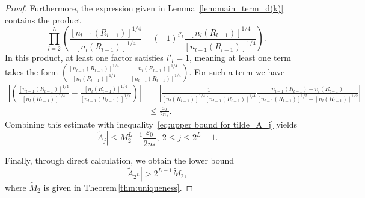 \documentclass[11pt,reqno]{amsart}
\theoremstyle{definition}
\theoremstyle{remark}
\numberwithin{equation}{section}
\begin{document}
\begin{proof}
Furthermore, the expression given in Lemma~\ref{lem:main_term_d(k)} contains the product  
\begin{equation*}
  \prod_{l=2}^{L} \left( \frac{\left[n_{l-1}(R_{l-1})\right]^{1/4}}{\left[n_l(R_{l-1})\right]^{1/4}}
	+ (-1)^{i'_l} \frac{\left[n_l(R_{l-1})\right]^{1/4}}{\left[n_{l-1}(R_{l-1})\right]^{1/4}} \right).
\end{equation*}
In this product, at least one factor satisfies $i'_l = 1$, meaning at least one term takes the form 
$\left(\frac{\left[n_{l-1}(R_{l-1})\right]^{1/4}}{\left[n_l(R_{l-1})\right]^{1/4}}-\frac{\left[n_l(R_{l-1})\right]^{1/4}}{\left[n_{l-1}(R_{l-1})\right]^{1/4}} \right)$. For such a term we have  
\begin{equation*}
  \begin{aligned}
     \left|\left( \frac{\left[n_{l-1}(R_{l-1})\right]^{1/4}}{\left[n_l(R_{l-1})\right]^{1/4}}-\frac{\left[n_l(R_{l-1})\right]^{1/4}}{\left[n_{l-1}(R_{l-1})\right]^{1/4}} \right)\right|&=\left|\frac{1}{\left[n_l(R_{l-1})\right]^{1/4}\left[n_{l-1}(R_{l-1})\right]^{1/4}}\frac{n_{l-1}(R_{l-1})-n_l(R_{l-1})}{\left[n_{l-1}(R_{l-1})\right]^{1/2}+\left[n_l(R_{l-1})\right]^{1/2}}\right|\\
     &\leq \frac{\varepsilon_0}{2n_{*}}.~
  \end{aligned}
\end{equation*}
Combining this estimate with inequality~\eqref{eq:upper bound for tilde_A_j} yields
\begin{equation}\label{eq:upper bound for tilde_A_j2}
	\left|\tilde{A}_j\right|\leq M_2^{L-1}\frac{\varepsilon_0}{2n_{*}}, ~ 2 \leq j \leq 2^L-1.
\end{equation}

Finally, through direct calculation, we obtain the lower bound
\begin{equation}\label{eq:estimation for tilde A_2^L}
 |\tilde{A}_{2^L}|>2^{L-1}\widetilde{M}_2, 
\end{equation}
where $\widetilde{M}_2$ is given in Theorem\,\ref{thm:uniqueness}.


\end{proof}
\end{document}

